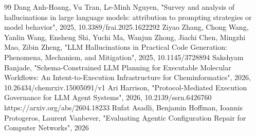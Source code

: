 \documentclass[conference]{IEEEtran}
\begin{document}
\begin{thebibliography}{99}
 Dang Anh-Hoang, Vu Tran, Le-Minh Nguyen, "Survey and analysis of hallucinations in large language models: attribution to prompting strategies or model behavior", 2025, 10.3389/frai.2025.1622292
 Ziyao Zhang, Chong Wang, Yanlin Wang, Ensheng Shi, Yuchi Ma, Wanjun Zhong, Jiachi Chen, Mingzhi Mao, Zibin Zheng, "LLM Hallucinations in Practical Code Generation: Phenomena, Mechanism, and Mitigation", 2025, 10.1145/3728894
 Sakshyam Banjade, "Schema-Constrained LLM Planning for Executable Molecular Workflows: An Intent-to-Execution Infrastructure for Cheminformatics", 2026, 10.26434/chemrxiv.15005091/v1
 Ari Harrison, "Protocol-Mediated Execution Governance for LLM Agent Systems", 2026, 10.2139/ssrn.6426760
 https://arxiv.org/abs/2604.18233
 Rufat Asadli, Benjamin Hoffman, Ioannis Protogeros, Laurent Vanbever, "Evaluating Agentic Configuration Repair for Computer Networks", 2026
\end{thebibliography}
\end{document}
